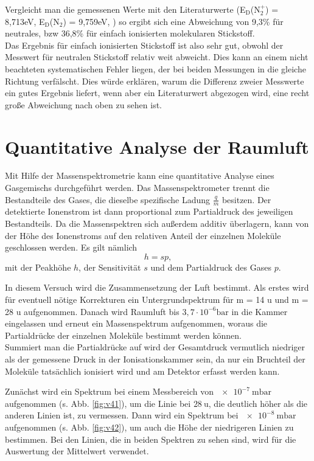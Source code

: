 Vergleicht man die gemessenen Werte mit den Literaturwerte (E$_\textrm{D}$(N$_2^+$) = 8,713\;eV, E$_\textrm{D}$(N$_2$) = 9,759\;eV, \cite{kobra}) so
ergibt sich eine Abweichung von 9,3\% für neutrales, bzw 36,8\% für einfach ionisierten molekularen Stickstoff.\\
Das Ergebnis für einfach ionisierten Stickstoff ist also sehr gut, obwohl der Messwert für neutralen Stickstoff relativ weit abweicht. Dies kann an einem nicht beachteten systematischen Fehler liegen, der bei beiden Messungen in die gleiche Richtung verfälscht. Dies würde erklären, warum die Differenz zweier Messwerte ein gutes Ergebnis liefert, wenn aber ein Literaturwert abgezogen wird, eine recht große Abweichung nach oben zu sehen ist.\\

\section{Quantitative Analyse der Raumluft}

Mit Hilfe der Massenspektrometrie kann eine quantitative Analyse eines Gasgemischs durchgeführt werden. Das Massenspektrometer trennt die Bestandteile des Gases, die dieselbe spezifische Ladung $\frac{q}{m}$ besitzen. Der detektierte Ionenstrom ist dann proportional zum Partialdruck des jeweiligen Bestandteils. Da die Massenspektren sich außerdem additiv überlagern, kann von der Höhe des Ionenstroms auf den relativen Anteil der einzelnen Moleküle geschlossen werden.
Es gilt nämlich
\begin{equation}
 h = sp,
\end{equation}
mit der Peakhöhe $h$, der Sensitivität $s$ und dem Partialdruck des Gases $p$.

In diesem Versuch wird die Zusammensetzung der Luft bestimmt.
Als erstes wird für eventuell nötige Korrekturen ein Untergrundspektrum für m = 14 u und m = 28 u aufgenommen.
Danach wird Raumluft bis $3,7\cdot10^{-6} \si{\bar}$ in die Kammer eingelassen und erneut ein Massenspektrum aufgenommen, woraus die Partialdrücke der einzelnen Moleküle bestimmt werden können.\\
Summiert man die Partialdrücke auf wird der Gesamtdruck vermutlich niedriger als der gemessene Druck in der Ionisationskammer sein, da nur ein Bruchteil der Moleküle tatsächlich ionisiert wird und am Detektor erfasst werden kann.

Zunächst wird ein Spektrum bei einem Messbereich von $\SI{e-7}{\milli\bar}$ aufgenommen (s. Abb. \ref{fig:v41}), um die Linie bei $\SI{28}{\amu}$, die deutlich höher als die anderen Linien ist, zu vermessen. Dann wird ein Spektrum bei $\SI{e-8}{\milli\bar}$ aufgenommen (s. Abb. \ref{fig:v42}), um auch die Höhe der niedrigeren Linien zu bestimmen.
Bei den Linien, die in beiden Spektren zu sehen sind, wird für die Auswertung der Mittelwert verwendet.

